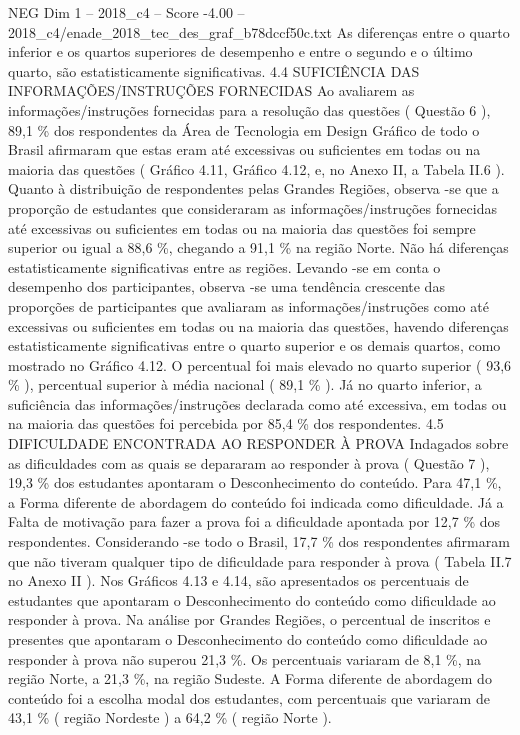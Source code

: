 \begin{textsample}{NEG Dim 1 – 2018\_c4 – Score -4.00 – 2018\_c4/enade\_2018\_tec\_des\_graf\_b78dccf50c.txt}
As diferenças entre o quarto inferior e os quartos superiores de desempenho e entre o segundo e o último quarto, são estatisticamente significativas. 4.4 SUFICIÊNCIA DAS INFORMAÇÕES/INSTRUÇÕES FORNECIDAS Ao avaliarem as informações/instruções fornecidas para a resolução das questões ( Questão 6 ), 89,1 \% dos respondentes da Área de Tecnologia em Design Gráfico de todo o Brasil afirmaram que estas eram até excessivas ou suficientes em todas ou na maioria das questões ( Gráfico 4.11, Gráfico 4.12, e, no Anexo II, a Tabela II.6 ).
Quanto à distribuição de respondentes pelas Grandes Regiões, observa -se que a proporção de estudantes que consideraram as informações/instruções fornecidas até excessivas ou suficientes em todas ou na maioria das questões foi sempre superior ou igual a 88,6 \%, chegando a 91,1 \% na região Norte.
Não há diferenças estatisticamente significativas entre as regiões.
Levando -se em conta o desempenho dos participantes, observa -se uma tendência crescente das proporções de participantes que avaliaram as informações/instruções como até excessivas ou suficientes em todas ou na maioria das questões, havendo diferenças estatisticamente significativas entre o quarto superior e os demais quartos, como mostrado no Gráfico 4.12.
O percentual foi mais elevado no quarto superior ( 93,6 \% ), percentual superior à média nacional ( 89,1 \% ).
Já no quarto inferior, a suficiência das informações/instruções declarada como até excessiva, em todas ou na maioria das questões foi percebida por 85,4 \% dos respondentes. 4.5 DIFICULDADE ENCONTRADA AO RESPONDER À PROVA Indagados sobre as dificuldades com as quais se depararam ao responder à prova ( Questão 7 ), 19,3 \% dos estudantes apontaram o Desconhecimento do conteúdo.
Para 47,1 \%, a Forma diferente de abordagem do conteúdo foi indicada como dificuldade.
Já a Falta de motivação para fazer a prova foi a dificuldade apontada por 12,7 \% dos respondentes.
Considerando -se todo o Brasil, 17,7 \% dos respondentes afirmaram que não tiveram qualquer tipo de dificuldade para responder à prova ( Tabela II.7 no Anexo II ).
Nos Gráficos 4.13 e 4.14, são apresentados os percentuais de estudantes que apontaram o Desconhecimento do conteúdo como dificuldade ao responder à prova.
Na análise por Grandes Regiões, o percentual de inscritos e presentes que apontaram o Desconhecimento do conteúdo como dificuldade ao responder à prova não superou 21,3 \%.
Os percentuais variaram de 8,1 \%, na região Norte, a 21,3 \%, na região Sudeste.
A Forma diferente de abordagem do conteúdo foi a escolha modal dos estudantes, com percentuais que variaram de 43,1 \% ( região Nordeste ) a 64,2 \% ( região Norte ).

\end{textsample}
